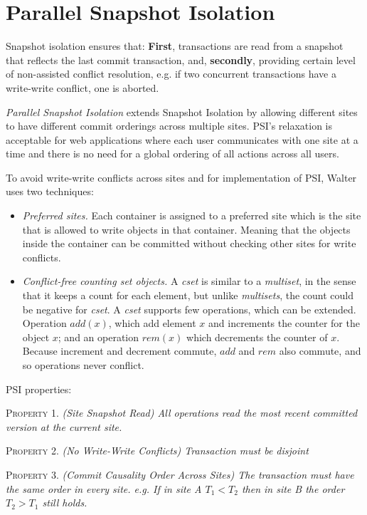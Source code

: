 \documentclass[a4paper]{article}
\begin{document}
\section{Parallel Snapshot Isolation}
Snapshot isolation ensures that: \textbf{First}, transactions are read from a snapshot that reflects the last commit transaction, and, \textbf{secondly}, providing certain level of non-assisted conflict resolution, e.g. if two concurrent transactions have a write-write conflict, one is aborted.
 
\textit{Parallel Snapshot Isolation} extends Snapshot Isolation by allowing different sites to have different commit orderings across multiple sites. PSI's relaxation is acceptable for web applications where each user communicates with one site at a time and there is no need for a global ordering of all actions across all users. 

To avoid write-write conflicts across sites and for implementation of PSI, Walter uses two techniques:
\begin{itemize}
\item \textit{Preferred sites.} Each container is assigned to a preferred site which is the site that is allowed to write objects in that container. Meaning that the objects inside the container can be committed without checking other sites for write conflicts.
\item \textit{Conflict-free counting set objects.} A \textit{cset} is similar to a \textit{multiset}, in the sense that it keeps a count for each element, but unlike \textit{multisets}, the count could be negative for \textit{cset}. A \textit{cset} supports few operations, which can be extended. Operation $add(x)$, which add element $x$ and increments the counter for the object $x$; and an operation $rem(x)$ which decrements the counter of $x$. Because increment and decrement commute, $add$ and $rem$ also commute, and so operations never conflict. 
\end{itemize}

PSI properties:

\textsc{Property} 1. \textit{(Site Snapshot Read) All operations read the most recent committed version at the current site.}

\textsc{Property} 2. \textit{(No Write-Write Conflicts) Transaction must be disjoint}

\textsc{Property} 3. \textit{(Commit Causality Order Across Sites) The transaction must have the same order in every site. e.g. If in site \emph{A} $T_1<T_2$ then in site \emph{B} the order $T_2>T_1$ still holds.}
\end{document}
